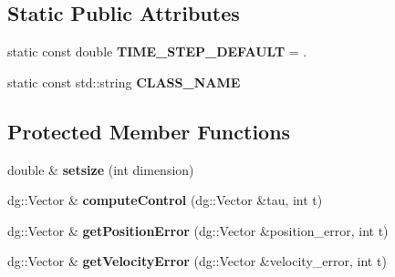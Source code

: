 \subsection*{Static Public Attributes}
\begin{DoxyCompactItemize}
\item 
static const double {\bfseries T\+I\+M\+E\+\_\+\+S\+T\+E\+P\+\_\+\+D\+E\+F\+A\+U\+LT} = .\hypertarget{classdynamicgraph_1_1sot_1_1PDController_a0fd0dd695567d7daa489a5ef2a8028cf}{}\label{classdynamicgraph_1_1sot_1_1PDController_a0fd0dd695567d7daa489a5ef2a8028cf}

\item 
static const std\+::string {\bfseries C\+L\+A\+S\+S\+\_\+\+N\+A\+ME}\hypertarget{classdynamicgraph_1_1sot_1_1PDController_a2a377e6b4997e8c0123bb925a59081e7}{}\label{classdynamicgraph_1_1sot_1_1PDController_a2a377e6b4997e8c0123bb925a59081e7}

\end{DoxyCompactItemize}
\subsection*{Protected Member Functions}
\begin{DoxyCompactItemize}
\item 
double \& {\bfseries setsize} (int dimension)\hypertarget{classdynamicgraph_1_1sot_1_1PDController_a52c3f044f1fc263b3bfd6f6c3e55458d}{}\label{classdynamicgraph_1_1sot_1_1PDController_a52c3f044f1fc263b3bfd6f6c3e55458d}

\item 
dg\+::\+Vector \& {\bfseries compute\+Control} (dg\+::\+Vector \&tau, int t)\hypertarget{classdynamicgraph_1_1sot_1_1PDController_a1c1b10166419971121ec5418bf79332b}{}\label{classdynamicgraph_1_1sot_1_1PDController_a1c1b10166419971121ec5418bf79332b}

\item 
dg\+::\+Vector \& {\bfseries get\+Position\+Error} (dg\+::\+Vector \&position\+\_\+error, int t)\hypertarget{classdynamicgraph_1_1sot_1_1PDController_ad4c37478445c4556752da1d6bdfedf00}{}\label{classdynamicgraph_1_1sot_1_1PDController_ad4c37478445c4556752da1d6bdfedf00}

\item 
dg\+::\+Vector \& {\bfseries get\+Velocity\+Error} (dg\+::\+Vector \&velocity\+\_\+error, int t)\hypertarget{classdynamicgraph_1_1sot_1_1PDController_a2ec1b3f5eade54cfaa6f2c6e25f04267}{}\label{classdynamicgraph_1_1sot_1_1PDController_a2ec1b3f5eade54cfaa6f2c6e25f04267}

\end{DoxyCompactItemize}
